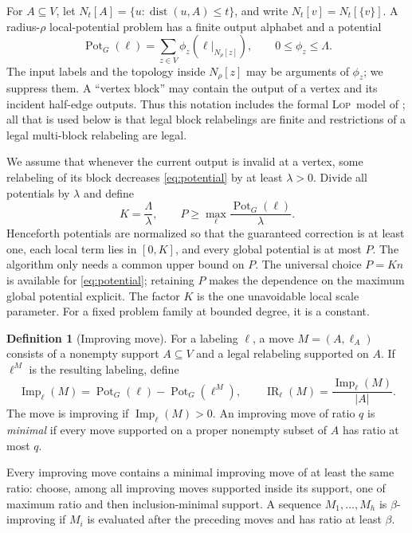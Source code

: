 \documentclass[11pt]{article}
\theoremstyle{definition}
\newtheorem{definition}[theorem]{Definition}
\theoremstyle{remark}
\newcommand{\dist}{\operatorname{dist}}
\newcommand{\Pot}{\operatorname{Pot}}
\newcommand{\Imp}{\operatorname{Imp}}
\newcommand{\IR}{\operatorname{IR}}
\newcommand{\N}{N}
\newcommand{\LOP}{\textnormal{\textsc{Lop}}}
\begin{document}
For $A\subseteq V$, let $\N_t[A]=\{u:\dist(u,A)\leq t\}$, and write
$\N_t[v]=\N_t[\{v\}]$.  A radius-$\rho$ local-potential problem has a finite output
alphabet and a potential
\begin{equation}\label{eq:potential}
  \Pot_G(\ell)=\sum_{z\in V}\phi_z(\ell|_{\N_\rho[z]}),
  \qquad 0\leq \phi_z\leq \Lambda.
\end{equation}
The input labels and the topology inside $\N_\rho[z]$ may be arguments of $\phi_z$;
we suppress them.  A ``vertex block'' may contain the output of a vertex and its
incident half-edge outputs.  Thus this notation includes the formal \LOP\ model of
\cite{BalliuEtAl2026}; all that is used below is that legal block relabelings are
finite and restrictions of a legal multi-block relabeling are legal.

We assume that whenever the current output is invalid at a vertex, some relabeling
of its block decreases \eqref{eq:potential} by at least $\lambda>0$.  Divide all
potentials by $\lambda$ and define
\begin{equation}\label{eq:KP}
  K=\frac{\Lambda}{\lambda},
  \qquad
  P\geq \max_{\ell}\frac{\Pot_G(\ell)}{\lambda}.
\end{equation}
Henceforth potentials are normalized so that the guaranteed correction is at least
one, each local term lies in $[0,K]$, and every global potential is at most $P$.
The algorithm only needs a common upper bound on $P$.  The universal choice $P=Kn$
is available for \eqref{eq:potential}; retaining $P$ makes the dependence on the
maximum global potential explicit.  The factor $K$ is the one unavoidable local
scale parameter.  For a fixed problem family at bounded degree, it is a constant.

\begin{definition}[Improving move]
For a labeling $\ell$, a move $M=(A,\ell_A)$ consists of a nonempty support
$A\subseteq V$ and a legal relabeling supported on $A$.  If $\ell^M$ is the
resulting labeling, define
\[
  \Imp_\ell(M)=\Pot_G(\ell)-\Pot_G(\ell^M),
  \qquad
  \IR_\ell(M)=\frac{\Imp_\ell(M)}{|A|}.
\]
The move is improving if $\Imp_\ell(M)>0$.  An improving move of ratio $q$ is
\emph{minimal} if every move supported on a proper nonempty subset of $A$ has ratio
at most $q$.
\end{definition}

Every improving move contains a minimal improving move of at least the same ratio:
choose, among all improving moves supported inside its support, one of maximum ratio
and then inclusion-minimal support.  A sequence $M_1,\ldots,M_h$ is
$\beta$-improving if $M_i$ is evaluated after the preceding moves and has ratio at
least $\beta$.
\end{document}
